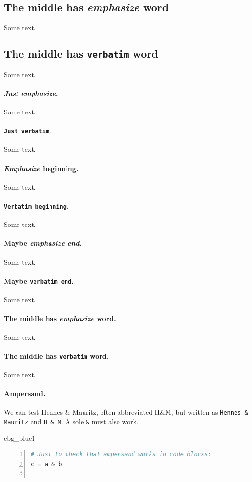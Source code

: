 \documentclass[%
oneside,                 %
final,                   %
10pt]{article}
\newenvironment{_cod_tight}[1]{
   \def\FrameCommand{\colorbox{#1}}
   \FrameRule0.6pt\MakeFramed {\FrameRestore}\vskip3mm}
   {\vskip0mm\endMakeFramed}
\newenvironment{cod}[1]{
\bgroup\rmfamily
\fboxsep=0mm\relax
\begin{_cod_tight}{#1}
\list{}{\parsep=-2mm\parskip=0mm\topsep=0pt\leftmargin=2mm
\rightmargin=2\leftmargin\leftmargin=4pt\relax}
\item\relax}
{\endlist\end{_cod_tight}\egroup}
\theoremstyle{definition}
\begin{document}
\begin{enumerate}
\subsection{The middle has \emph{emphasize} word}
Some text.
\subsection{The middle has \texttt{verbatim} word}
Some text.
\paragraph{\emph{Just emphasize}.}
Some text.
\paragraph{\texttt{Just verbatim}.}
Some text.
\paragraph{\emph{Emphasize} beginning.}
Some text.
\paragraph{\texttt{Verbatim beginning}.}
Some text.
\paragraph{Maybe \emph{emphasize end}.}
Some text.
\paragraph{Maybe \texttt{verbatim end}.}
Some text.
\paragraph{The middle has \emph{emphasize} word.}
Some text.
\paragraph{The middle has \texttt{verbatim} word.}
Some text.
\paragraph{Ampersand.}
We can test Hennes {\&} Mauritz, often abbreviated H{\&}M, but written
as \Verb!Hennes & Mauritz! and \Verb!H & M!.
A sole \Verb!&! must also work.
\begin{cod}{cbg_blue1}\begin{lstlisting}[language=Python,style=myspeciallststyle,numbers=left,numberstyle=\tiny,stepnumber=3,numbersep=15pt,xleftmargin=1mm]
# Just to check that ampersand works in code blocks:
c = a & b


\end{lstlisting}
\end{cod}
\end{enumerate}
\end{document}
